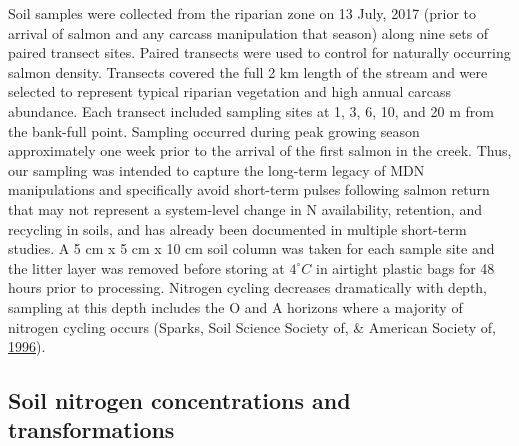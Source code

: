 \documentclass [11pt, proquest] {uwthesis}[2015/03/03]
\begin{document}
Soil samples were collected from the riparian zone on 13 July, 2017
(prior to arrival of salmon and any carcass manipulation that season)
along nine sets of paired transect sites. Paired transects were used to
control for naturally occurring salmon density. Transects covered the
full 2 km length of the stream and were selected to represent typical
riparian vegetation and high annual carcass abundance. Each transect
included sampling sites at 1, 3, 6, 10, and 20 m from the bank-full
point. Sampling occurred during peak growing season approximately one
week prior to the arrival of the first salmon in the creek. Thus, our
sampling was intended to capture the long-term legacy of MDN
manipulations and specifically avoid short-term pulses following salmon
return that may not represent a system-level change in N availability,
retention, and recycling in soils, and has already been documented in
multiple short-term studies. A 5 cm x 5 cm x 10 cm soil column was taken
for each sample site and the litter layer was removed before storing at
\(4^{\circ}C\) in airtight plastic bags for 48 hours prior to
processing. Nitrogen cycling decreases dramatically with depth, sampling
at this depth includes the O and A horizons where a majority of nitrogen
cycling occurs (Sparks, Soil Science Society of, \& American Society of,
\protect\hyperlink{ref-Sparks1996}{1996}).

\subsection{Soil nitrogen concentrations and
transformations}\label{soil-nitrogen-concentrations-and-transformations}
\end{document}
